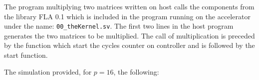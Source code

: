 \begin{exemplu}
The program multiplying two matrices written on host calls the components from the library FLA 0.1 which is included in the program running on the accelerator under the name: {\tt 00\_theKernel.sv}. The first two lines in the host program generates the two matrices to be multiplied. The call of multiplication is preceded by the function which start the cycles counter on controller and is followed by the start function. 
{\em 
{}
}


The simulation provided, for $p=16$, the following:


\end{exemplu}
